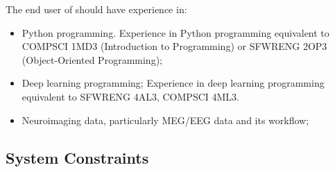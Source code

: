 \documentclass[12pt]{article}
\begin{document}


The end user of \progname{} should have experience in:

\begin{itemize}
\item Python programming. Experience in Python programming equivalent to COMPSCI 1MD3 (Introduction to Programming) or SFWRENG 2OP3 (Object-Oriented Programming);
\item Deep learning programming; Experience in deep learning programming equivalent to SFWRENG 4AL3, COMPSCI 4ML3.
\item Neuroimaging data, particularly MEG/EEG data and its workflow;
\end{itemize}


















\subsection{System Constraints}

\end{document}
